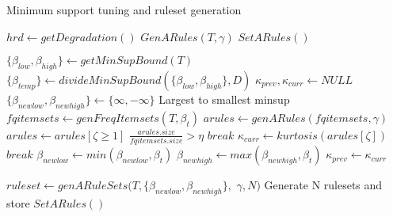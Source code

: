         \begin{algorithm}
        \footnotesize{
            \caption{Minimum support tuning and ruleset generation}
            \label{alg:minsuptune}
            \begin{algorithmic}[1]
                    \State $hrd \gets getDegradation()$
                        \State $GenARules(T, \gamma)$
                    \EndIf
                    \State $SetARules()$
                \EndProcedure

                    \State $\{\beta_{low}, \beta_{high}\} \gets getMinSupBound(T)$
                    \State $\{\beta_{temp}\} \gets divideMinSupBound(\{\beta_{low}, \beta_{high}\}, D)$
                    \State $\kappa_{prev}, \kappa_{curr} \gets NULL$
                    \State $\{\beta_{newlow}, \beta_{newhigh}\} \gets \{\infty, -\infty\}$
                     \Comment Largest to smallest minsup
                        \State $fqitemsets \gets genFreqItemsets(T, \beta_{t})$
                            \State $arules \gets genARules(fqitemsets, \gamma)$
                            \State $arules \gets arules[\zeta \ge 1]$
                            \If $\frac{arules.size}{fqitemsets.size} > \eta$
                                \State $break$
                            \Else
                                \State $\kappa_{curr} \gets kurtosis(arules[\zeta])$
                                    \State $break$
                                \Else
                                    \State $\beta_{newlow} \gets min(\beta_{newlow}, \beta_{t})$
                                    \State $\beta_{newhigh} \gets max(\beta_{newhigh}, \beta_{t})$
                                    \State $\kappa_{prev} \gets \kappa_{curr}$
                                \EndIf
                            \EndIf
                        \EndIf
                    \EndFor

                    \State $ruleset \gets genARuleSets(T, \{\beta_{newlow}, \beta_{newhigh}\}, $ $\gamma, N)$ \Comment Generate N rulesets and store
                    \State $SetARules()$
                \EndProcedure
            \end{algorithmic}
            }
        \end{algorithm}
        
